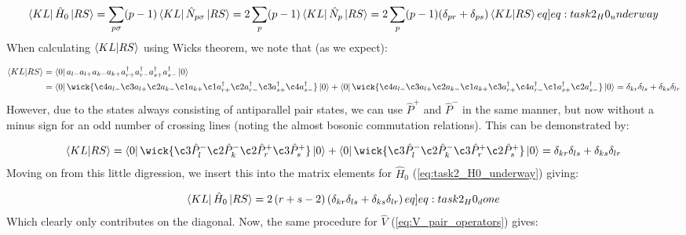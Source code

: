 \documentclass{article}
\newcommand{\crt}[1]{a_{#1}^{\dagger}}
\newcommand{\ani}[1]{a_{#1}}
\newcommand{\inner}[3]{\bra{#1}#2\ket{#3}}
\newcommand{\pplus}[1]{\hat{P}_{#1}^{+}}
\newcommand{\pminus}[1]{\hat{P}_{#1}^{-}}
\newcommand{\numberop}[1]{\hat{N}_{#1}}
\begin{document}
    \begin{align}
        \bra{KL}\hat{H}_0\ket{RS} = \sum_{p\sigma} (p-1) \bra{KL}\numberop{p\sigma}\ket{RS} = 2\sum_{p}(p-1)\bra{KL}\numberop{p}\ket{RS} = 2\sum_p (p-1) (\delta_{pr} + \delta_{ps}) \bra{KL}\ket{RS} \label[eq]{eq:task2_H0_underway} 
    \end{align}
    When calculating $\bra{KL}\ket{RS}$ using Wicks theorem, we note that (as we expect):
    
    \begin{align*}
        \bra{KL}\ket{RS} &= \bra{0} \ani{l-}\ani{l+}\ani{k-}\ani{k+}\crt{r+}\crt{r-}\crt{s+}\crt{s-}\ket{0} \\
        &= \bra{0} \wick{ \c4{\ani{l-}} \c3{\ani{l+}} \c2{\ani{k-}} \c1{\ani{k+}}\c1{a}_{r+}^\dagger \c2{a}_{r-}^\dagger \c3{a}_{s+}^\dagger \c4{a}_{s-}^\dagger }\ket{0} + \bra{0} \wick{ \c4{\ani{l-}} \c3{\ani{l+}} \c2{\ani{k-}} \c1{\ani{k+}}\c3{a}_{r+}^\dagger \c4{a}_{r-}^\dagger \c1{a}_{s+}^\dagger \c2{a}_{s-}^\dagger }\ket{0} = \delta_{kr}\delta_{ls} + \delta_{ks}\delta_{lr}
    \end{align*}
    However, due to the states always consisting of antiparallel pair states, we can use $\pplus{}$ and $\pminus{}$ in the same manner, but now without a minus sign for an odd number of crossing lines (noting the almost bosonic commutation relations). This can be demonstrated by:
    
    \begin{align*}
        \bra{KL}\ket{RS} = \bra{0} \wick{ \c3{\pminus{l}} \c2{\pminus{k}} \c2{\pplus{r}} \c3{\pplus{s}} } \ket{0} + \bra{0} \wick{ \c3{\pminus{l}} \c2{\pminus{k}} \c3{\pplus{r}} \c2{\pplus{s}} } \ket{0} = \delta_{kr}\delta_{ls} + \delta_{ks}\delta_{lr}
    \end{align*}
    Moving on from this little digression, we insert this into the matrix elements for $\hat{H}_0$ (\cref{eq:task2_H0_underway}) giving:

    \begin{align}
        \inner{KL}{\hat{H}_0}{RS} = 2\left( r+s-2\right) \left( \delta_{kr}\delta_{ls} + \delta_{ks}\delta_{lr} \right) \label[eq]{eq:task2_H0_done}
    \end{align}
    Which clearly only contributes on the diagonal. Now, the same procedure for $\hat{V}$ (\cref{eq:V_pair_operators}) gives: 
\end{document}
